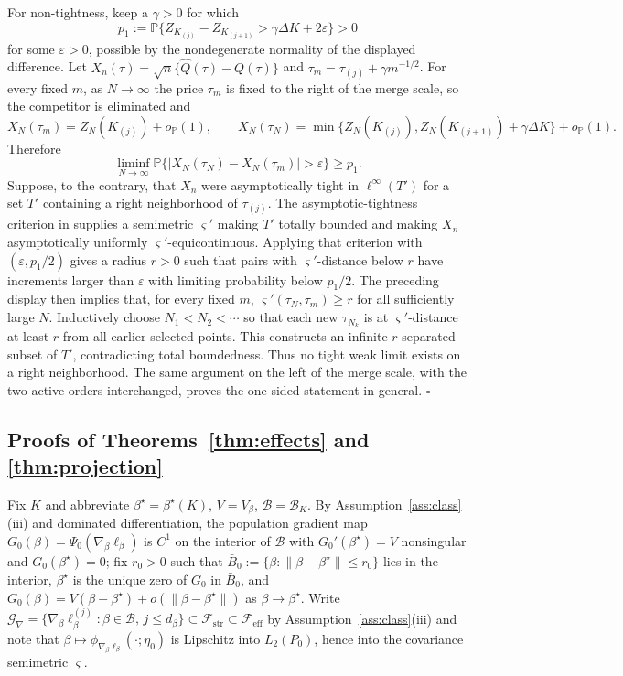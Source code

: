 \documentclass[11pt]{article}
\newcommand{\Pp}{\mathbb P}
\newcommand{\opro}{o_{\Pp}}
\newcommand{\calB}{\mathcal B}
\newcommand{\calF}{\mathcal F}
\newcommand{\calG}{\mathcal G}
\newcommand{\eps}{\varepsilon}
\newcommand{\norm}[1]{\lVert #1\rVert}
\begin{document}
For non-tightness, keep a $\gamma>0$ for which
\[
p_1:=\Pp\{Z_{K_{(j)}}-Z_{K_{(j+1)}}>\gamma\Delta K+2\eps\}>0
\]
for some $\eps>0$, possible by the nondegenerate normality of the displayed difference. Let $X_n(\tau)=\sqrt n\{\widehat Q(\tau)-Q(\tau)\}$ and $\tau_m=\tau_{(j)}+\gamma m^{-1/2}$.  For every fixed $m$, as $N\to\infty$ the price $\tau_m$ is fixed to the right of the merge scale, so the competitor is eliminated and
\[
X_N(\tau_m)=Z_N(K_{(j)})+\opro(1),
\qquad
X_N(\tau_N)=\min\{Z_N(K_{(j)}),Z_N(K_{(j+1)})+\gamma\Delta K\}+\opro(1).
\]
Therefore
\[
\liminf_{N\to\infty}\Pp\{|X_N(\tau_N)-X_N(\tau_m)|>\eps\}\ge p_1 .
\]
Suppose, to the contrary, that $X_n$ were asymptotically tight in $\ell^\infty(T')$ for a set $T'$ containing a right neighborhood of $\tau_{(j)}$.  The asymptotic-tightness criterion in \cite[Theorem~1.5.7]{vdvwellner1996} supplies a semimetric $\varsigma'$ making $T'$ totally bounded and making $X_n$ asymptotically uniformly $\varsigma'$-equicontinuous.  Applying that criterion with $(\eps,p_1/2)$ gives a radius $r>0$ such that pairs with $\varsigma'$-distance below $r$ have increments larger than $\eps$ with limiting probability below $p_1/2$. The preceding display then implies that, for every fixed $m$, $\varsigma'(\tau_N,\tau_m)\ge r$ for all sufficiently large $N$.  Inductively choose $N_1<N_2<\cdots$ so that each new $\tau_{N_k}$ is at $\varsigma'$-distance at least $r$ from all earlier selected points.  This constructs an infinite $r$-separated subset of $T'$, contradicting total boundedness.  Thus no tight weak limit exists on a right neighborhood.  The same argument on the left of the merge scale, with the two active orders interchanged, proves the one-sided statement in general. \hfill$\square$

\subsection{Proofs of Theorems~\ref{thm:effects} and \ref{thm:projection}}\label{app:effects}

Fix $K$ and abbreviate $\beta^\star=\beta^\star(K)$, $V=V_\beta$, $\calB=\calB_K$. By Assumption~\ref{ass:class}(iii) and dominated differentiation, the population gradient map $G_0(\beta)=\Psi_0(\nabla_\beta\ell_\beta)$ is $C^1$ on the interior of $\calB$ with $G_0'(\beta^\star)=V$ nonsingular and $G_0(\beta^\star)=0$; fix $r_0>0$ such that $\bar B_0:=\{\beta:\norm{\beta-\beta^\star}\le r_0\}$ lies in the interior, $\beta^\star$ is the unique zero of $G_0$ in $\bar B_0$, and $G_0(\beta)=V(\beta-\beta^\star)+o(\norm{\beta-\beta^\star})$ as $\beta\to\beta^\star$. Write $\calG_\nabla=\{\nabla_\beta\ell_\beta^{(j)}:\beta\in\calB,\,j\le d_\beta\}\subset\calF_{\mathrm{str}}\subset\calF_{\mathrm{eff}}$ by Assumption~\ref{ass:class}(iii) and note that $\beta\mapsto\phi_{\nabla_\beta\ell_\beta}(\cdot;\eta_0)$ is Lipschitz into $L_2(P_0)$, hence into the covariance semimetric $\varsigma$.
\end{document}
